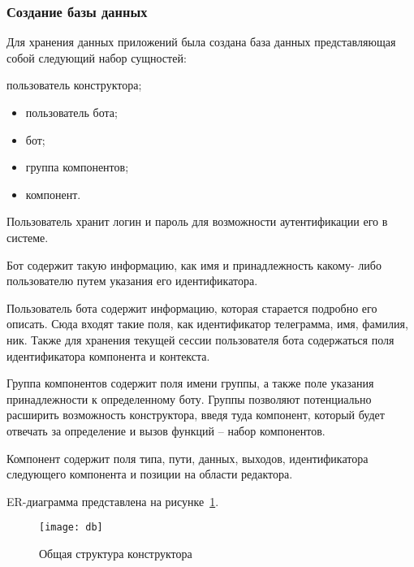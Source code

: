 
\subsubsection{Создание базы данных}

Для хранения данных приложений была создана база данных
представляющая собой следующий набор сущностей:

пользователь конструктора;
\begin{itemize}
	\item пользователь бота;
	\item бот;
	\item группа компонентов;
	\item компонент.
\end{itemize}

Пользователь хранит логин и пароль для возможности аутентификации
его в системе.

Бот содержит такую информацию, как имя и принадлежность какому-
либо пользователю путем указания его идентификатора.

Пользователь бота содержит информацию, которая старается подробно
его описать. Сюда входят такие поля, как идентификатор телеграмма, имя,
фамилия, ник. Также для хранения текущей сессии пользователя бота
содержаться поля идентификатора компонента и контекста.

Группа компонентов содержит поля имени группы, а также поле
указания принадлежности к определенному боту. Группы позволяют
потенциально расширить возможность конструктора, введя туда компонент,
который будет отвечать за определение и вызов функций – набор
компонентов.

Компонент содержит поля типа, пути, данных, выходов,
идентификатора следующего компонента и позиции на области редактора.

ER-диаграмма представлена на рисунке~\ref{f:erd}.
\newpage
\begin{figure}[!ht]
	\centering
	\texttt{[image: db]}
	\caption{Общая структура конструктора}
	\label{f:erd}
\end{figure}


